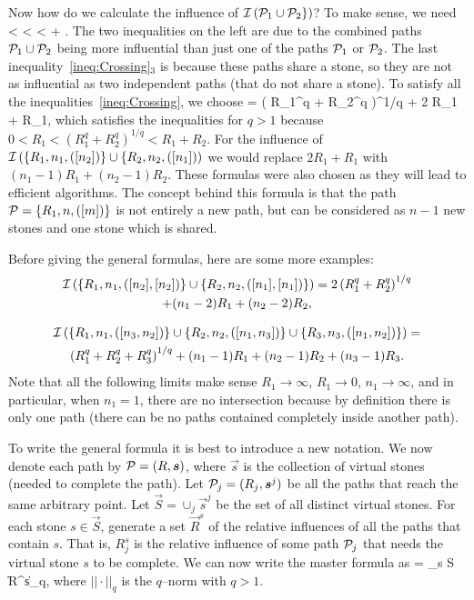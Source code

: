 \documentclass[doublespacing, 12pt, a4paper]{article}
\begin{document}
Now how do we calculate the influence of $\mathcal I \left( \mathcal P_1 \cup \mathcal P_2 \} \right)$? To make sense, we need
\be
\label{ineq:Crossing}
  <  <  <  + .
\en
The two inequalities on the left are due to the combined paths $\mathcal P_1 \cup \mathcal P_2$ being more influential than just one of the paths $\mathcal P_1$ or $\mathcal P_2$. The last inequality~\eqref{ineq:Crossing}${}_3$ is because these paths share a stone, so they are not as influential as two independent paths (that do not share a stone).
To satisfy all the inequalities~\eqref{ineq:Crossing}, we choose
\be
{} = \left ( R_1^q + R_2^q \right )^{1/q} + 2 R_1 + R_1,
\en
which satisfies the inequalities for $q>1$ because $0< R_1 < (R_1^q +R_2^q )^{1/q} < R_1 + R_2$. For the influence of $\mathcal I \left( \{R_1, n_1,([n_2])\} \cup \{R_2, n_2,([n_1])\right)$ we would replace $ 2 R_1 + R_1$ with $(n_1-1) R_1 + (n_2-1) R_2$.
These formulas were also chosen as they will lead to efficient algorithms. The concept behind this formula is that the path $\mathcal P = \{R_1,n,([m])\}$ is not entirely a new path, but can be considered as $n-1$ new stones and one stone which is shared.

Before giving the general formulas, here are some more examples:
\begin{multline*}
  \mathcal I \left( \{R_1, n_1,([n_2],[n_2])\} \cup \{R_2, n_2,([n_1],[n_1])\} \right) = 2\left( R_1^q + R_2^q \right)^{1/q}
  \\ + (n_1-2)R_1 + (n_2-2)R_2,
\end{multline*}
\vspace{-2.5cm}

\begin{multline*}
\mathcal I \left( \{R_1, n_1,([n_3,n_2])\} \cup \{R_2, n_2,([n_1,n_3])\} \cup \{R_3, n_3,([n_1,n_2])\} \right) = \\
     \left( R_1^q + R_2^q + R_3^q \right)^{1/q}
     + (n_1-1)R_1 + (n_2-1) R_2 + (n_3-1)R_3.
\end{multline*}
Note that all the following limits make sense $R_1 \to \infty$, $R_1 \to 0$, $n_1 \to \infty$, and in particular, when $n_1 =1$, there are no intersection because by definition there is only one path (there can be no paths contained completely inside another path).

To write the general formula it is best to introduce a new notation. We now denote each path by $\mathcal P = (R, \boldsymbol{s})$, where $\vec s$ is the collection of virtual stones (needed to complete the path).
Let $\mathcal P_j = (R_j, \boldsymbol{s}^j)$ be all the paths that reach the same arbitrary point.
Let $\vec {S} = \cup_j \vec s^j$ be the set of all distinct virtual stones.
For each stone $s \in \vec {S}$, generate a set $\vec R^s$ of the relative influences of all the paths that contain $s$. That is, $R^s_j$ is the relative influence of some path $\mathcal P_j$ that needs the virtual stone $s$ to be complete. We can now write the master formula as
\be
{} = \sum_{s \in \vec S} \|\vec R^s\|_q,
\label{eqn:master}
\en
where $||\cdot ||_q$ is the $q$--norm with $q>1$.
\end{document}
